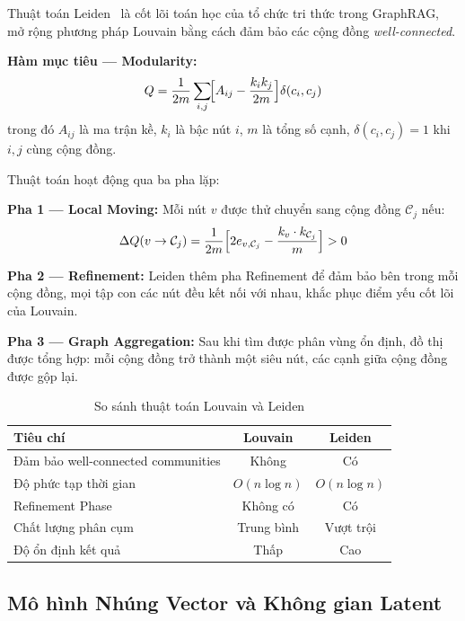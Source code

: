 \documentclass[10pt, conference, a4paper]{IEEEtran}
\begin{document}
Thuật toán Leiden~\cite{traag2019leiden} là cốt lõi toán học của tổ
chức tri thức trong GraphRAG, mở rộng phương pháp Louvain bằng cách
đảm bảo các cộng đồng \emph{well-connected}.

\textbf{Hàm mục tiêu — Modularity:}
\begin{equation}
  Q = \frac{1}{2m}\sum_{i,j}
    \!\Bigl[A_{ij} - \frac{k_i k_j}{2m}\Bigr]\delta(c_i,c_j)
  \label{eq:modularity}
\end{equation}
trong đó $A_{ij}$ là ma trận kề, $k_i$ là bậc nút $i$, $m$ là tổng
số cạnh, $\delta(c_i,c_j)=1$ khi $i,j$ cùng cộng đồng.

Thuật toán hoạt động qua ba pha lặp:

\textbf{Pha 1 — Local Moving:} Mỗi nút $v$ được thử chuyển sang
cộng đồng $\mathcal{C}_j$ nếu:
\begin{equation}
  \Delta Q(v \to \mathcal{C}_j) = \frac{1}{2m}
    \Bigl[2e_{v,\mathcal{C}_j}
    - \frac{k_v \cdot k_{\mathcal{C}_j}}{m}\Bigr] > 0
  \label{eq:delta_q}
\end{equation}

\textbf{Pha 2 — Refinement:} Leiden thêm pha Refinement để đảm
bảo bên trong mỗi cộng đồng, mọi tập con các nút đều kết nối với nhau,
khắc phục điểm yếu cốt lõi của Louvain.

\textbf{Pha 3 — Graph Aggregation:} Sau khi tìm được phân vùng ổn định,
đồ thị được tổng hợp: mỗi cộng đồng trở thành một siêu nút, các cạnh
giữa cộng đồng được gộp lại.

\begin{table}[h]
\centering
\caption{So sánh thuật toán Louvain và Leiden}
\begin{tabular}{@{}lcc@{}}
\toprule
\textbf{Tiêu chí} & \textbf{Louvain} & \textbf{Leiden} \\
\midrule
Đảm bảo well-connected communities & Không & Có \\
Độ phức tạp thời gian & $O(n\log n)$ & $O(n\log n)$ \\
Refinement Phase & Không có & Có \\
Chất lượng phân cụm & Trung bình & Vượt trội \\
Độ ổn định kết quả & Thấp & Cao \\
\bottomrule
\end{tabular}
\label{tab:leiden_compare}
\end{table}

\subsection{Mô hình Nhúng Vector và Không gian Latent}
\end{document}
